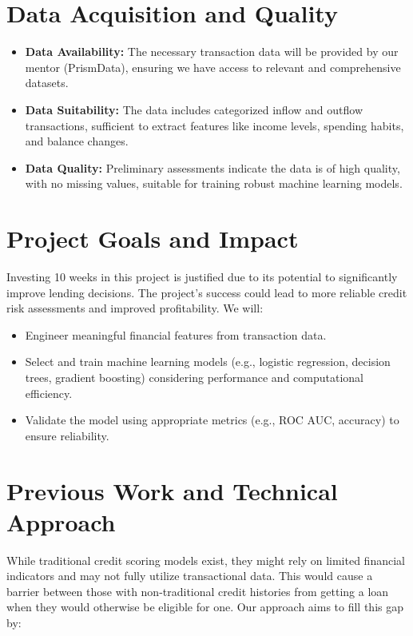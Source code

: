 \documentclass[12pt,letterpaper]{article}
\begin{document}
\section{Data Acquisition and Quality}

\begin{itemize}
    \item \textbf{Data Availability:} The necessary transaction data will be provided by our mentor (PrismData), ensuring we have access to relevant and comprehensive datasets.
    \item \textbf{Data Suitability:} The data includes categorized inflow and outflow transactions, sufficient to extract features like income levels, spending habits, and balance changes.
    \item \textbf{Data Quality:} Preliminary assessments indicate the data is of high quality, with no missing values, suitable for training robust machine learning models.
\end{itemize}

\section{Project Goals and Impact}

Investing 10 weeks in this project is justified due to its potential to significantly improve lending decisions. The project's success could lead to more reliable credit risk assessments and improved profitability. We will:
\begin{itemize}
    \item Engineer meaningful financial features from transaction data.
    \item Select and train machine learning models (e.g., logistic regression, decision trees, gradient boosting) considering performance and computational efficiency.
    \item Validate the model using appropriate metrics (e.g., ROC AUC, accuracy) to ensure reliability.
\end{itemize}

\section{Previous Work and Technical Approach}

While traditional credit scoring models exist, they might rely on limited financial indicators and may not fully utilize transactional data. This would cause a barrier between those with non-traditional credit histories from getting a loan when they would otherwise be eligible for one. Our approach aims to fill this gap by:
\end{document}
